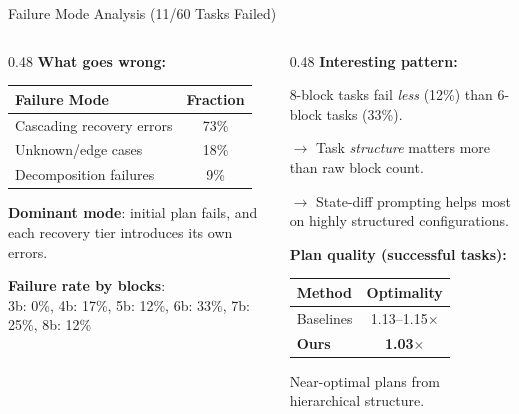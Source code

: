 \documentclass[aspectratio=169]{beamer}
\begin{document}
\begin{frame}{Failure Mode Analysis (11/60 Tasks Failed)}

\begin{columns}[T]
\begin{column}{0.48\textwidth}
\textbf{What goes wrong:}

\vspace{0.2cm}
\begin{tabular}{lc}
\toprule
\textbf{Failure Mode} & \textbf{Fraction} \\
\midrule
Cascading recovery errors & 73\% \\
Unknown/edge cases & 18\% \\
Decomposition failures & 9\% \\
\bottomrule
\end{tabular}

\vspace{0.3cm}
\textbf{Dominant mode}: initial plan fails, and each recovery tier introduces its own errors.

\vspace{0.2cm}
\textbf{Failure rate by blocks}: \\
{\small 3b: 0\%, 4b: 17\%, 5b: 12\%, 6b: 33\%, 7b: 25\%, 8b: 12\%}
\end{column}

\begin{column}{0.48\textwidth}
\textbf{Interesting pattern:}

\vspace{0.2cm}
8-block tasks fail \textit{less} (12\%) than 6-block tasks (33\%).

\vspace{0.2cm}
$\rightarrow$ Task \textit{structure} matters more than raw block count.

$\rightarrow$ State-diff prompting helps most on highly structured configurations.

\vspace{0.3cm}
\textbf{Plan quality (successful tasks):}

\vspace{0.1cm}
\begin{tabular}{lc}
\toprule
\textbf{Method} & \textbf{Optimality} \\
\midrule
Baselines & 1.13--1.15$\times$ \\
\textbf{Ours} & \textbf{1.03$\times$} \\
\bottomrule
\end{tabular}

{\small Near-optimal plans from hierarchical structure.}
\end{column}
\end{columns}

\end{frame}
\end{document}
